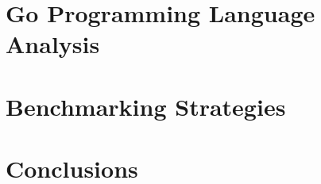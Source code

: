 \section{Go Programming Language Analysis}




\section{Benchmarking Strategies}





\section{Conclusions}